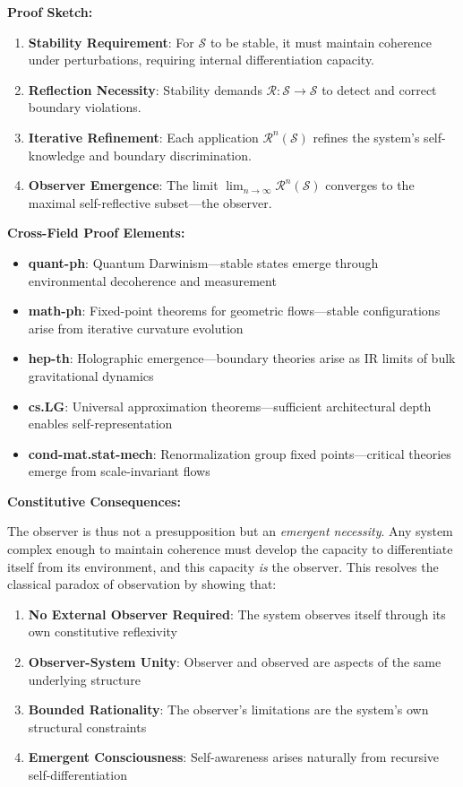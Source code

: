 \begin{scholium}
\begin{theorem}
\textbf{Proof Sketch:} 
\begin{enumerate}
\item \textbf{Stability Requirement}: For $\mathcal{S}$ to be stable, it must maintain coherence under perturbations, requiring internal differentiation capacity.
\item \textbf{Reflection Necessity}: Stability demands $\mathcal{R}: \mathcal{S} \rightarrow \mathcal{S}$ to detect and correct boundary violations.
\item \textbf{Iterative Refinement}: Each application $\mathcal{R}^n(\mathcal{S})$ refines the system's self-knowledge and boundary discrimination.
\item \textbf{Observer Emergence}: The limit $\lim_{n \to \infty} \mathcal{R}^n(\mathcal{S})$ converges to the maximal self-reflective subset—the observer.
\end{enumerate}

\textbf{Cross-Field Proof Elements:}
\begin{itemize}
\item \textbf{quant-ph}: Quantum Darwinism—stable states emerge through environmental decoherence and measurement
\item \textbf{math-ph}: Fixed-point theorems for geometric flows—stable configurations arise from iterative curvature evolution
\item \textbf{hep-th}: Holographic emergence—boundary theories arise as IR limits of bulk gravitational dynamics
\item \textbf{cs.LG}: Universal approximation theorems—sufficient architectural depth enables self-representation
\item \textbf{cond-mat.stat-mech}: Renormalization group fixed points—critical theories emerge from scale-invariant flows
\end{itemize}
\end{theorem}

\textbf{Constitutive Consequences:}

The observer is thus not a presupposition but an \textit{emergent necessity}. Any system complex enough to maintain coherence must develop the capacity to differentiate itself from its environment, and this capacity \textit{is} the observer. This resolves the classical paradox of observation by showing that:

\begin{enumerate}
\item \textbf{No External Observer Required}: The system observes itself through its own constitutive reflexivity
\item \textbf{Observer-System Unity}: Observer and observed are aspects of the same underlying structure
\item \textbf{Bounded Rationality}: The observer's limitations are the system's own structural constraints
\item \textbf{Emergent Consciousness}: Self-awareness arises naturally from recursive self-differentiation
\end{enumerate}


\end{scholium}

